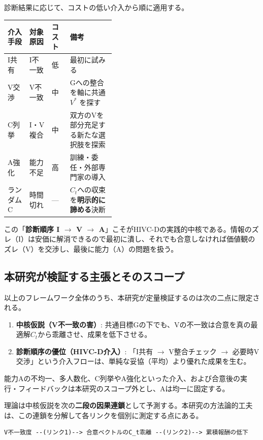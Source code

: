 \documentclass[11pt]{ltjsarticle}
\newcommand{\Ct}{\ensuremath{C_t}}
\begin{document}
診断結果に応じて、コストの低い介入から順に適用する。

\begin{longtable}{@{}l l l p{0.42\linewidth}@{}}
\toprule
介入手段 & 対象原因 & コスト & 備考 \\
\midrule
I共有 & I不一致 & 低 & 最初に試みる \\
V交渉 & V不一致 & 中 & Gへの整合を軸に共通 $V^*$ を探す \\
C列挙 & I・V複合 & 中 & 双方のVを部分充足する新たな選択肢を探索 \\
A強化 & 能力不足 & 高 & 訓練・委任・外部専門家の導入 \\
ランダムC & 時間切れ & --- & \Ct{}への収束を\textbf{明示的に諦める}決断 \\
\bottomrule
\end{longtable}

この「\textbf{診断順序 I $\to$ V $\to$ A}」こそがHIVC-Dの実践的中核である。情報のズレ（I）は安価に解消できるので最初に潰し、それでも合意しなければ価値観のズレ（V）を交渉し、最後に能力（A）の問題を扱う。

\subsection{本研究が検証する主張とそのスコープ}

以上のフレームワーク全体のうち、本研究が定量検証するのは次の二点に限定される。

\begin{enumerate}[nosep]
  \item \textbf{中核仮説（V不一致の害）}: 共通目標Gの下でも、Vの不一致は合意を真の最適解\Ct{}から乖離させ、成果を低下させる。
  \item \textbf{診断順序の優位（HIVC-D介入）}: 「I共有 $\to$ V整合チェック $\to$ 必要時V交渉」という介入フローは、単純な妥協（平均）より優れた成果を生む。
\end{enumerate}

能力Aの不均一、多人数化、C列挙やA強化といった介入、および合意後の実行・フィードバックは本研究のスコープ外とし、Aは均一に固定する。

理論は中核仮説を次の\textbf{二段の因果連鎖}として予測する。本研究の方法論的工夫は、この連鎖を分解して各リンクを個別に測定する点にある。

\begin{Verbatim}[frame=single,fontsize=\small]
V不一致度 --(リンク1)--> 合意ベクトルのC_t乖離 --(リンク2)--> 累積報酬の低下
\end{Verbatim}
\end{document}
